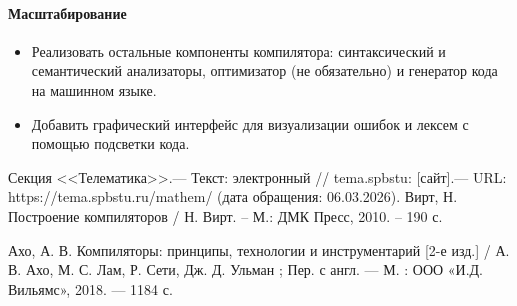 \documentclass[a4paper,final]{article}
\begin{document}
\paragraph{Масштабирование}
\begin{itemize}
    \item Реализовать остальные компоненты компилятора: синтаксический и семантический анализаторы, оптимизатор (не обязательно) и генератор кода на машинном языке.
    \item Добавить графический интерфейс для визуализации ошибок и лексем с помощью подсветки кода.
\end{itemize}

\newpage
{}
\begin{thebibliography}{}
     Секция <<Телематика>>.— Текст: электронный // tema.spbstu: [сайт].— URL: https://tema.spbstu.ru/mathem/ (дата обращения: 06.03.2026).
     Вирт, Н. Построение компиляторов / Н. Вирт. – М.: ДМК Пресс, 2010. – 190 с.

     Ахо, А. В. Компиляторы: принципы, технологии и инструментарий [2-е изд.] / А. В. Ахо, М. С. Лам, Р. Сети, Дж. Д. Ульман ; Пер. с англ. — М. : ООО «И.Д. Вильямс», 2018. — 1184 с.
\end{thebibliography}
\end{document}
